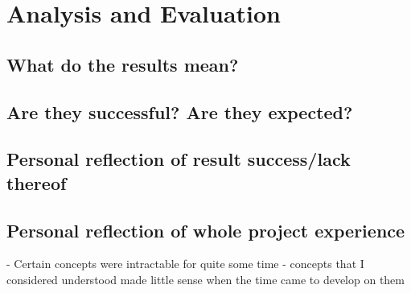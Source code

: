 \chapter{Analysis and Evaluation}

\section{What do the results mean?}

\section{Are they successful? Are they expected?}

\section{Personal reflection of result success/lack thereof}

\section{Personal reflection of whole project experience}
 - Certain concepts were intractable for quite some time 
 - concepts that I considered understood made little sense when the time came to
 develop on them